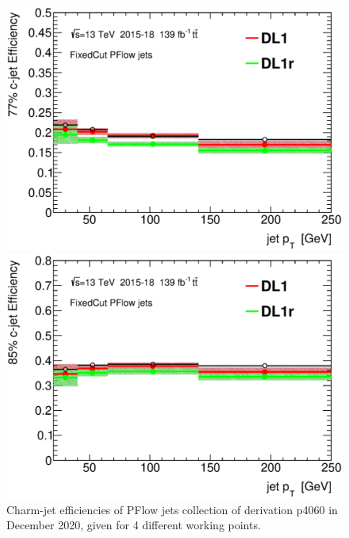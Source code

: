 \documentclass[letterpaper,12pt]{article}
\begin{document}
\begin{figure}[H]
\begin{minipage}[b]{.45\textwidth}
\includegraphics[width=1\textwidth]{SFplots_december/DL1allPFlowDec_DL1rallPFlowDec/eff77.eps}
\end{minipage}\hfill
\begin{minipage}[b]{.45\textwidth}
\centering
\includegraphics[width=1\textwidth]{SFplots_december/DL1allPFlowDec_DL1rallPFlowDec/eff85.eps}
\end{minipage}
\caption{Charm-jet efficiencies of PFlow jets collection of derivation 
p4060 in December 2020, given for 4 different working points.} \label{fig:Dec_eff_PFlow}
\end{figure}
\end{document}
